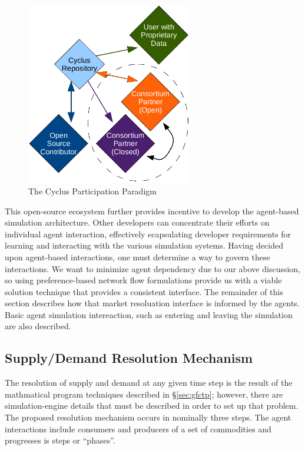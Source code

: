 \begin{figure}[htbp!]
  \begin{center}
    \includegraphics[height=8cm]{./chapters/research/community.png}
  \end{center}
  \caption{The Cyclus Participation Paradigm} 
  \label{fig:community}
\end{figure}

This open-source ecosystem further provides incentive to develop the agent-based
simulation architecture. Other developers can concentrate their efforts on
individual agent interaction, effectively ecapsulating developer requirements
for learning and interacting with the various simulation systems. Having decided
upon agent-based interactions, one must determine a way to govern these
interactions. We want to minimize agent dependency due to our above discussion,
so using preference-based network flow formulations provide us with a viable
solution technique that provides a consistent interface. The remainder of this
section describes how that market resoluation interface is informed by the
agents. Basic agent simulation intereaction, such as entering and leaving the
simulation are also described.

\subsection{Supply/Demand Resolution Mechanism}

The resolution of supply and demand at any given time step is the result of the
mathmatical program techniques described in \S\ref{sec:gfctp}; however, there
are simulation-engine details that must be described in order to set up that
problem. The proposed resolution mechanism occurs in nominally three steps. The
agent interactions include consumers and producers of a set of commodities and
progresses is steps or ``phases''.

